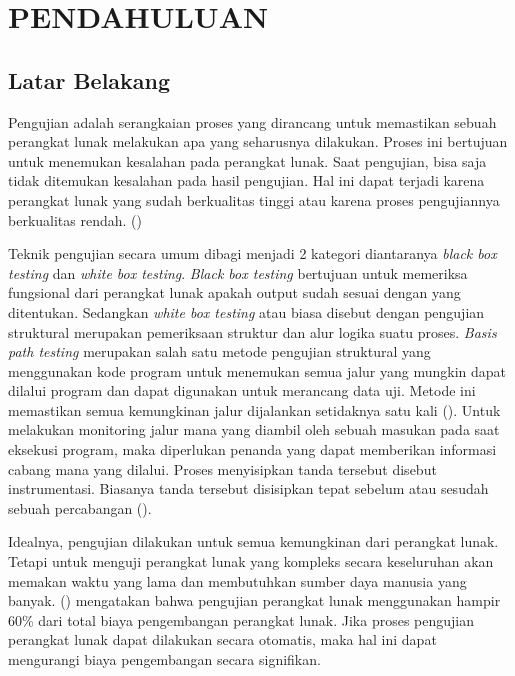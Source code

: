 \section*{PENDAHULUAN} %
\subsection*{Latar Belakang}
Pengujian adalah serangkaian proses yang dirancang untuk memastikan sebuah perangkat lunak melakukan apa yang seharusnya dilakukan. Proses ini bertujuan untuk menemukan kesalahan pada perangkat lunak. Saat pengujian, bisa saja tidak ditemukan kesalahan pada hasil pengujian. Hal ini dapat terjadi karena perangkat lunak yang sudah berkualitas tinggi atau karena proses pengujiannya berkualitas rendah. (\cite{GLENFORD2012})

Teknik pengujian secara umum dibagi menjadi 2 kategori diantaranya \textit{black box testing} dan \textit{white box testing}. \textit{Black box testing} bertujuan untuk memeriksa fungsional dari perangkat lunak apakah output sudah sesuai dengan yang ditentukan. Sedangkan \textit{white box testing} atau biasa disebut dengan pengujian struktural merupakan pemeriksaan struktur dan alur logika suatu proses. \textit{Basis path testing} merupakan salah satu metode pengujian struktural yang menggunakan kode program untuk menemukan semua jalur yang mungkin dapat dilalui program dan dapat digunakan untuk merancang data uji. Metode ini memastikan semua kemungkinan jalur dijalankan setidaknya satu kali (\cite{BASU2015}). Untuk melakukan monitoring jalur mana yang diambil oleh sebuah masukan pada saat eksekusi program, maka diperlukan penanda yang dapat memberikan informasi cabang mana yang dilalui. Proses menyisipkan tanda tersebut disebut instrumentasi. Biasanya tanda tersebut disisipkan tepat sebelum atau sesudah sebuah percabangan (\cite{TIKIR2011}). 

Idealnya, pengujian dilakukan untuk semua kemungkinan dari perangkat lunak. Tetapi untuk menguji perangkat lunak yang kompleks secara keseluruhan akan memakan waktu yang lama dan membutuhkan sumber daya manusia yang banyak. \citeauthor{KUMAR20168} (\cite*{KUMAR20168}) mengatakan bahwa pengujian perangkat lunak menggunakan hampir 60\% dari total biaya pengembangan perangkat lunak. Jika proses pengujian perangkat lunak dapat dilakukan secara otomatis, maka hal ini dapat mengurangi biaya pengembangan secara signifikan. 

